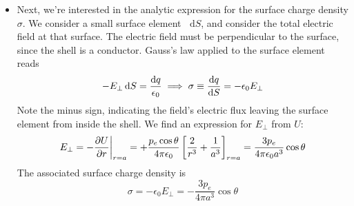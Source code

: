 \documentclass[11pt, a4paper]{article}
\newcommand{\diff}{\mathop{}\!\mathrm{d}} %
\newcommand{\e}{\epsilon_{0}} %
\begin{document}
\begin{itemize}
	\item Next, we're interested in the analytic expression for the surface charge density $ \sigma $. We consider a small surface element $ \diff S $, and consider the total electric field at that surface. The electric field must be perpendicular to the surface, since the shell is a conductor. Gauss's law applied to the surface element reads
	\begin{equation*}
		- E_{\perp} \diff S = \frac{\diff q}{\e} \implies \sigma \equiv \dv{q}{S} = -\e E_{\perp}
	\end{equation*}
	Note the minus sign, indicating the field's electric flux leaving the surface element from inside the shell. We find an expression for $ E_{\perp} $ from $ U $:
	\begin{equation*}
		E_{\perp} = -\pdv{U}{r}\bigg|_{r = a} = + \frac{p_{e}\cos \theta}{4\pi \e}\left[\frac{2}{r^{3}} + \frac{1}{a^{3}}\right]_{r = a} = \frac{3p_{e}}{4\pi \e a^{3}} \cos \theta
	\end{equation*}
	The associated surface charge density is
	\begin{equation*}
		\sigma = -\e E_{\perp} = -\frac{3p_{e}}{4\pi a^{3}} \cos \theta
	\end{equation*}
	
	
\end{itemize}
\end{document}
